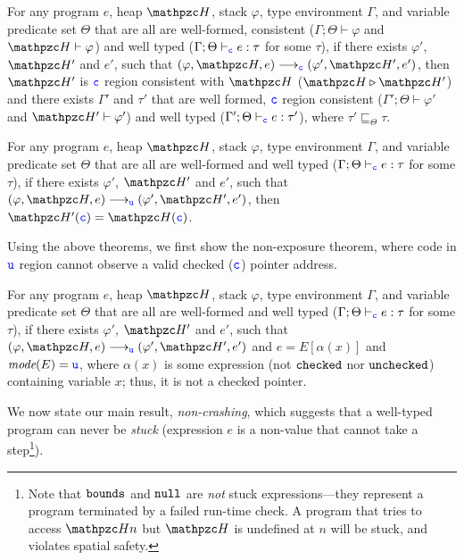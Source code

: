 \begin{thm}
For any \systemname program $e$, heap $\heap$, stack
$\varphi$, type environment $\Gamma$, and variable predicate set $\Theta$
that are all are well-formed, consistent
($\Gamma;\Theta\vdash \varphi$ and $\heap \vdash \varphi$) and well
typed ($\Gamma;\Theta\vdash_{\textcolor{blue}{\texttt{c}}} e : \tau$ for some $\tau$), if there exists $\varphi'$,
$\heap'$ and $e'$, such that $(\varphi,\heap,e)
\longrightarrow_{\cmode} (\varphi',\heap',e')$, then $\heap'$ is
$\textcolor{blue}{\texttt{c}}$ region consistent with $\heap$ ($\heap \triangleright \heap'$) and there exists
$\Gamma'$ and $\tau'$ that are well formed, $\textcolor{blue}{\texttt{c}}$ region consistent
($\Gamma';\Theta\vdash \varphi'$ and $\heap' \vdash \varphi'$) and
well typed ($\Gamma';\Theta \vdash_{\textcolor{blue}{\texttt{c}}} e: \tau'$), where
$\tau'\sqsubseteq_{\Theta} \tau$.
\end{thm}
\begin{thm}
For any \systemname program $e$, heap $\heap$, stack
$\varphi$, type environment $\Gamma$, and variable predicate set $\Theta$
that are all are well-formed and well
typed ($\Gamma;\Theta\vdash_{\textcolor{blue}{\texttt{c}}} e : \tau$ for some $\tau$), if there exists $\varphi'$,
$\heap'$ and $e'$, such that $(\varphi,\heap,e)
\longrightarrow_{\umode} (\varphi',\heap',e')$, then $\heap'(\cmode)=\heap(\cmode)$.
\end{thm}

Using the above theorems, we first show the non-exposure theorem,
where code in $\textcolor{blue}{\texttt{u}}$ region cannot observe a valid checked ($\textcolor{blue}{\texttt{c}}$) pointer address.

\begin{thm}
For any \systemname program $e$, heap $\heap$, stack
$\varphi$, type environment $\Gamma$, and variable predicate set $\Theta$
that are all are well-formed and well
typed ($\Gamma;\Theta\vdash_{\textcolor{blue}{\texttt{c}}} e : \tau$ for some $\tau$), if there exists $\varphi'$,
$\heap'$ and $e'$, such that $(\varphi,\heap,e)
\longrightarrow_{\umode} (\varphi',\heap',e')$ and $e=E[\alpha(x)]$ and $\textit{mode}(E)=\textcolor{blue}{\texttt{u}}$,
where $\alpha(x)$ is some expression (not $\mathtt{checked}$ nor $\mathtt{unchecked}$) containing variable $x$; 
thus, it is not a checked pointer.
\end{thm}

We now state our main result, {\em non-crashing},
which suggests that a well-typed program can never be \emph{stuck} (expression
$e$ is a non-value that cannot take a step\footnote{Note that
  $\mathtt{bounds}$ and $\mathtt{null}$ are \emph{not} stuck expressions---they represent a
  program terminated by a failed run-time check. A program that tries to access $\heap{n}$
  but $\heap$ is undefined at $n$ will be stuck, and violates spatial
  safety.}).

